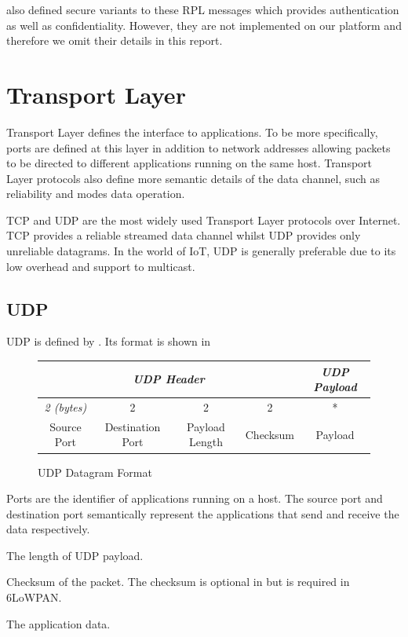 \cite{rfc6550} also defined secure variants to these RPL messages which provides authentication as well as confidentiality. However, they are not implemented on our platform and therefore we omit their details in this report.

\section{Transport Layer} \label{Sec: Transportation Layer}
Transport Layer defines the interface to applications. To be more specifically, ports are defined at this layer in addition to network addresses allowing packets to be directed to different applications running on the same host. Transport Layer protocols also define more semantic details of the data channel, such as reliability and modes data operation.

TCP and UDP are the most widely used Transport Layer protocols over Internet. TCP provides a reliable streamed data channel whilst UDP provides only unreliable datagrams. In the world of IoT, UDP is generally preferable due to its low overhead and support to multicast.

\subsection{UDP}
UDP is defined by \cite{rfc768}. Its format is shown in 
\begin{figure}[h!]
	\center
	\begin{tabular}{ccccc}
		\multicolumn{4}{c}{\textit{UDP Header}}                                                                                                                & \textit{UDP Payload}         \\ \hline
		\multicolumn{1}{|c|}{\textit{2 (bytes)}} & \multicolumn{1}{c|}{2}                & \multicolumn{1}{c|}{2}              & \multicolumn{1}{c|}{2}        & \multicolumn{1}{c|}{*}       \\ \hline
		\multicolumn{1}{|c|}{Source Port}        & \multicolumn{1}{c|}{Destination Port} & \multicolumn{1}{c|}{Payload Length} & \multicolumn{1}{c|}{Checksum} & \multicolumn{1}{c|}{Payload} \\ \hline
	\end{tabular}
	\caption{UDP Datagram Format}
	\label{Fig: UDP Datagram Format}
\end{figure}

\begin{description}[style=nextline]
	\item[\textbf{Source and Destination Port}]
	Ports are the identifier of applications running on a host. The source port and destination port semantically represent the applications that send and receive the data respectively.
	\item[\textbf{Payload Length}]
	The length of UDP payload.
	\item[\textbf{Checksum}]
	Checksum of the packet. The checksum is optional in \cite{rfc768} but is required in 6LoWPAN.
	\item[\textbf{Payload}]
	The application data.
\end{description}

